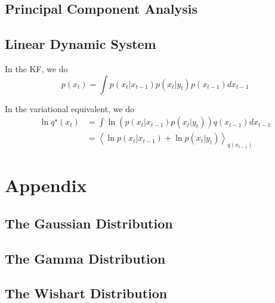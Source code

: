 \documentclass{article}
\newcommand{\<}{\langle}
\renewcommand{\>}{\rangle}
\begin{document}
\subsection{Principal Component Analysis}

\subsection{Linear Dynamic System}
In the KF, we do
\begin{equation}
p(x_t) = \int p(x_t | x_{t-1}) p(x_t | y_t) p(x_{t-1}) d x_{t-1}
\end{equation}

In the variational equivalent, we do
\begin{equation}
\begin{split}
\ln q^\star(x_t) &= \int \ln \left( p(x_t | x_{t-1}) p(x_t | y_t) \right) q(x_{t-1}) d x_{t-1}\\
            &= \left<  \ln  p(x_t | x_{t-1})  + \ln p(x_t | y_t)  \right>_{q(x_{t-1})}
\end{split}
\end{equation}


\section{Appendix}
\subsection{The Gaussian Distribution}
\subsection{The Gamma Distribution}
\subsection{The Wishart Distribution}
\end{document}
